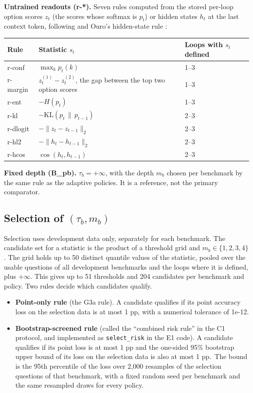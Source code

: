 \textbf{Untrained readouts (r-*).} Seven rules computed from the stored per-loop option scores \(z_t\) (the scores whose softmax is \(p_t\)) or hidden states \(h_t\) at the last context token, following \citet{Popescu2026} and Ouro's hidden-state rule \citep{Zhu2025}:

\begin{center}\small
\begin{tabular}{@{}lll@{}}
\toprule
Rule & Statistic \(s_t\) & Loops with \(s_t\) defined \\
\midrule
r-conf & \(\max_k p_t(k)\) & 1--3 \\
r-margin & \(z_t^{(1)} - z_t^{(2)}\), the gap between the top two option scores & 1--3 \\
r-ent & \(-H(p_t)\) & 1--3 \\
r-kl & \(-\mathrm{KL}(p_t \,\|\, p_{t-1})\) & 2--3 \\
r-dlogit & \(-\lVert z_t - z_{t-1} \rVert_2\) & 2--3 \\
r-hl2 & \(-\lVert h_t - h_{t-1} \rVert_2\) & 2--3 \\
r-hcos & \(\cos(h_t, h_{t-1})\) & 2--3 \\
\bottomrule
\end{tabular}
\end{center}

\textbf{Fixed depth (B\_pb).} \(\tau_b = +\infty\), with the depth \(m_b\) chosen per benchmark by the same rule as the adaptive policies. It is a reference, not the primary comparator.

\subsection{\texorpdfstring{Selection of \((\tau_b, m_b)\)}{Selection of (\textbackslash tau\_b, m\_b)}}

Selection uses development data only, separately for each benchmark. The candidate set for a statistic is the product of a threshold grid and \(m_b \in \{1,2,3,4\}\). The grid holds up to 50 distinct quantile values of the statistic, pooled over the usable questions of all development benchmarks and the loops where it is defined, plus \(+\infty\). This gives up to 51 thresholds and 204 candidates per benchmark and policy. Two rules decide which candidates qualify.

\begin{itemize}
\tightlist
\item
  \textbf{Point-only rule} (the G3a rule). A candidate qualifies if its point accuracy loss on the selection data is at most 1 pp, with a numerical tolerance of 1e-12.
\item
  \textbf{Bootstrap-screened rule} (called the ``combined risk rule'' in the C1 protocol, and implemented as \texttt{select\_risk} in the E1 code). A candidate qualifies if its point loss is at most 1 pp and the one-sided 95\% bootstrap upper bound of its loss on the selection data is also at most 1 pp.~The bound is the 95th percentile of the loss over 2,000 resamples of the selection questions of that benchmark, with a fixed random seed per benchmark and the same resampled draws for every policy.
\end{itemize}

